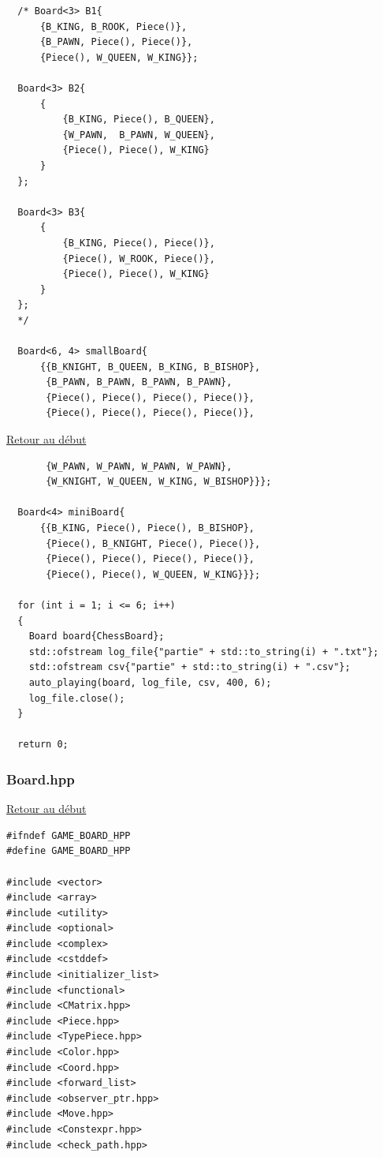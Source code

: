 {\begin{frame}[fragile]
\begin{verbatim}
  /* Board<3> B1{
      {B_KING, B_ROOK, Piece()},
      {B_PAWN, Piece(), Piece()},
      {Piece(), W_QUEEN, W_KING}};

  Board<3> B2{
      {
          {B_KING, Piece(), B_QUEEN},
          {W_PAWN,  B_PAWN, W_QUEEN},
          {Piece(), Piece(), W_KING}
      }
  };

  Board<3> B3{
      {
          {B_KING, Piece(), Piece()},
          {Piece(), W_ROOK, Piece()},
          {Piece(), Piece(), W_KING}
      }
  };
  */

  Board<6, 4> smallBoard{
      {{B_KNIGHT, B_QUEEN, B_KING, B_BISHOP},
       {B_PAWN, B_PAWN, B_PAWN, B_PAWN},
       {Piece(), Piece(), Piece(), Piece()},
       {Piece(), Piece(), Piece(), Piece()},
\end{verbatim}
\end{frame}

\begin{frame}[fragile]
\hyperlink{conclusion}{Retour au début}\newline
\begin{verbatim}
       {W_PAWN, W_PAWN, W_PAWN, W_PAWN},
       {W_KNIGHT, W_QUEEN, W_KING, W_BISHOP}}};

  Board<4> miniBoard{
      {{B_KING, Piece(), Piece(), B_BISHOP},
       {Piece(), B_KNIGHT, Piece(), Piece()},
       {Piece(), Piece(), Piece(), Piece()},
       {Piece(), Piece(), W_QUEEN, W_KING}}};

  for (int i = 1; i <= 6; i++)
  {
    Board board{ChessBoard};
    std::ofstream log_file{"partie" + std::to_string(i) + ".txt"};
    std::ofstream csv{"partie" + std::to_string(i) + ".csv"};
    auto_playing(board, log_file, csv, 400, 6);
    log_file.close();
  }

  return 0;

\end{verbatim}
\end{frame}

\begin{frame}[fragile]
\label{Board.hpp}
\frametitle{Board.hpp}
\hyperlink{conclusion}{Retour au début}\newline
\begin{verbatim}
#ifndef GAME_BOARD_HPP
#define GAME_BOARD_HPP

#include <vector>
#include <array>
#include <utility>
#include <optional>
#include <complex>
#include <cstddef>
#include <initializer_list>
#include <functional>
#include <CMatrix.hpp>
#include <Piece.hpp>
#include <TypePiece.hpp>
#include <Color.hpp>
#include <Coord.hpp>
#include <forward_list>
#include <observer_ptr.hpp>
#include <Move.hpp>
#include <Constexpr.hpp>
#include <check_path.hpp>


\end{verbatim}
\end{frame}}
